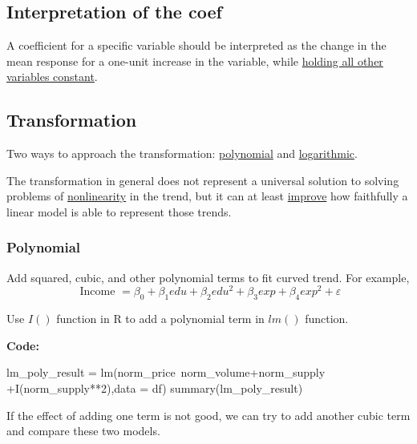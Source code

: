 \documentclass[12pt]{article}
\begin{document}
\subsection{Interpretation of the coef}

A coefficient for a specific variable should be interpreted as the
change in the mean response for a one-unit increase in the variable,
while {\underline {holding all other variables constant}}.




\subsection{Transformation}

Two ways to approach the transformation: 
{\underline {polynomial}} and {\underline {logarithmic}}.

The transformation in general does not represent a universal solution
to solving problems of {\underline {nonlinearity}} in the trend,
but it can at least {\underline {improve}} how faithfully a linear
model is able to represent those trends.



\subsubsection{Polynomial}
Add squared, cubic, and other polynomial terms to fit curved trend.
For example, 
\begin{equation*}
\text{ Income } = \beta_0 + \beta_1edu + \beta_2edu^{2} + 
\beta_3 exp + \beta_4exp^{2} + \varepsilon
\end{equation*}

Use $ I() $ function in R to add a polynomial term in $ lm() $ function.

{\textbf {Code:}}
\begin{rc}
lm_poly_result = lm(norm_price~norm_volume+norm_supply
+I(norm_supply**2),data = df)
summary(lm_poly_result)
\end{rc}


If the effect of adding one term is not good, we can try to add another 
cubic term and compare these two models.
\end{document}
